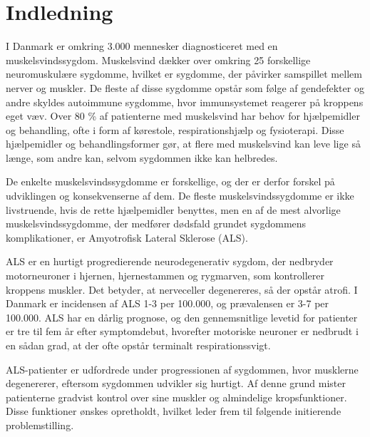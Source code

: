 \section{Indledning}



I Danmark er omkring 3.000 mennesker diagnosticeret med en muskelsvindssygdom. Muskelsvind dækker over omkring 25 forskellige neuromuskulære sygdomme, hvilket er sygdomme, der påvirker samspillet mellem nerver og muskler. De fleste af disse sygdomme opstår som følge af gendefekter og andre skyldes autoimmune sygdomme, hvor immunsystemet reagerer på kroppens eget væv. Over 80 \% af patienterne med muskelsvind har behov for hjælpemidler og behandling, ofte i form af kørestole, respirationshjælp og fysioterapi. Disse hjælpemidler og behandlingsformer gør, at flere med muskelsvind kan leve lige så længe, som andre kan, selvom sygdommen ikke kan helbredes. \citep{hvadermuskelsvind2016,sygdomsbeskrivelser2016}

De enkelte muskelsvindssygdomme er forskellige, og der er derfor forskel på udviklingen og konsekvenserne af dem. De fleste muskelsvindssygdomme er ikke livstruende, hvis de rette hjælpemidler benyttes, men en af de mest alvorlige muskelsvindssygdomme, der medfører dødsfald grundet sygdommens komplikationer, er Amyotrofisk Lateral Sklerose (ALS).  \citep{hvadermuskelsvind2016}

ALS er en hurtigt progredierende neurodegenerativ sygdom, der nedbryder motorneuroner i hjernen, hjernestammen og rygmarven, som kontrollerer kroppens muskler. Det betyder, at nerveceller degenereres, så der opstår atrofi. I Danmark er incidensen af ALS 1-3 per 100.000, og prævalensen er 3-7 per 100.000. ALS har en dårlig prognose, og den gennemsnitlige levetid for patienter er tre til fem år efter symptomdebut, hvorefter motoriske neuroner er nedbrudt i en sådan grad, at der ofte opstår terminalt respirationssvigt. \citep{russell2015, morris2015}

ALS-patienter er udfordrede under progressionen af sygdommen, hvor musklerne degenererer, eftersom sygdommen udvikler sig hurtigt. Af denne grund mister patienterne gradvist kontrol over sine muskler og almindelige kropsfunktioner. Disse funktioner ønskes opretholdt, hvilket leder frem til følgende initierende problemstilling. 
 
